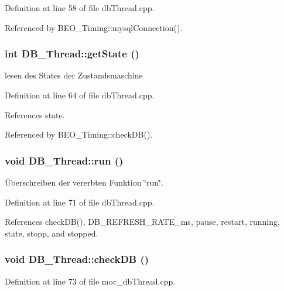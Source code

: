 Definition at line 58 of file dbThread.cpp.

Referenced by BEO\_\-Timing::mysqlConnection().\hypertarget{class_d_b___thread_01d2131117426b8f76c3aacb901f6de7}{
\subsubsection[getState]{\setlength{\rightskip}{0pt plus 5cm}int DB\_\-Thread::getState ()}}
\label{class_d_b___thread_01d2131117426b8f76c3aacb901f6de7}


lesen des States der Zustandsmaschine 



Definition at line 64 of file dbThread.cpp.

References state.

Referenced by BEO\_\-Timing::checkDB().\hypertarget{class_d_b___thread_bb50ad9355d7353eab556833a59e49e0}{
\subsubsection[run]{\setlength{\rightskip}{0pt plus 5cm}void DB\_\-Thread::run ()}}
\label{class_d_b___thread_bb50ad9355d7353eab556833a59e49e0}


Überschreiben der vererbten Funktion \char`\"{}run\char`\"{}. 



Definition at line 71 of file dbThread.cpp.

References checkDB(), DB\_\-REFRESH\_\-RATE\_\-ms, pause, restart, running, state, stopp, and stopped.\hypertarget{class_d_b___thread_4c701f484e76dda9fb89e6f0fadec67b}{
\subsubsection[checkDB]{\setlength{\rightskip}{0pt plus 5cm}void DB\_\-Thread::checkDB ()}}
\label{class_d_b___thread_4c701f484e76dda9fb89e6f0fadec67b}




Definition at line 73 of file moc\_\-dbThread.cpp.

